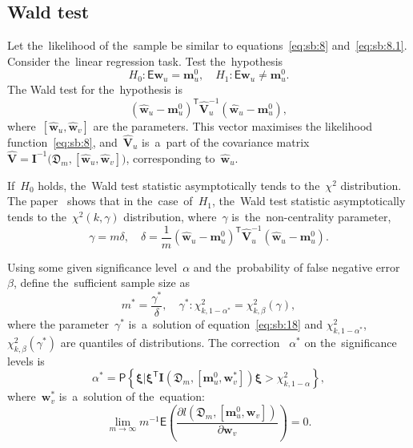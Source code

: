 \documentclass[
11pt,%
tightenlines,%
twoside,%
onecolumn,%
nofloats,%
nobibnotes,%
nofootinbib,%
superscriptaddress,%
noshowpacs,%
centertags]%
{revtex4}
\begin{document}
\subsection{Wald test}
Let the~likelihood of the~sample be similar to equations~\eqref{eq:sb:8} and~\eqref{eq:sb:8.1}. Consider the~linear regression task. Test the~hypothesis
\[
\label{eq:sb:15}
	H_0: \mathsf{E}\mathbf{w}_{u} = \mathbf{m}_{u}^{0}, \quad H_1: \mathsf{E}\mathbf{w}_{u} \not=\mathbf{m}_{u}^{0}.
\]
The Wald test for the~hypothesis is
\[
\label{eq:sb:16}
	\left(\hat{\mathbf{w}}_{u} - \mathbf{m}_{u}^{0}\right)^{\mathsf{T}}\hat{\mathbf{V}}_{u}^{-1}\left(\hat{\mathbf{w}}_{u} - \mathbf{m}_{u}^{0}\right),
\]
where~$[\hat{\mathbf{w}}_{u},\hat{\mathbf{w}}_{v}]$ are the parameters. This vector maximises the likelihood function~\eqref{eq:sb:8}, and~$\hat{\mathbf{V}}_u$ is~a~part of the covariance matrix~$\hat{\mathbf{V}}=\mathbf{I}^{-1}\bigr(\mathfrak{D}_m, [\hat{\mathbf{w}}_{u},\hat{\mathbf{w}}_{v}]\bigr)$, corresponding to~$\hat{\mathbf{w}}_{u}$.

If~$H_0$ holds, the~Wald test statistic asymptotically tends to the~$\chi^2$ distribution. The paper~\cite{shieh2005} shows that in the~case~of~$H_1$, the~Wald test statistic asymptotically tends to the~$\chi^2(k,\gamma)$ distribution, where~$\gamma$ is~the~non-centrality parameter,
\[
\label{eq:sb:17}
	\gamma = m\delta, \quad \delta = \frac{1}{m}\left(\hat{\mathbf{w}}_{u} - \mathbf{m}_{u}^{0}\right)^{\mathsf{T}}\hat{\mathbf{V}}_u^{-1}\left(\hat{\mathbf{w}}_{u} - \mathbf{m}_{u}^{0}\right).
\]

Using some given significance level~$\alpha$ and the~probability of false negative error~$\beta$, define the~sufficient sample size as
\[
\label{eq:sb:18}
	m^* = \frac{\gamma^*}{\delta}, \quad \gamma^*:\chi^2_{k, 1-\alpha^{*}} = \chi^2_{k, \beta}\left(\gamma\right),
\]
where the parameter~$\gamma^*$ is~a~solution of equation~\eqref{eq:sb:18} and $\chi^2_{k, 1-\alpha^*}$,~$\chi^2_{k, \beta}\left(\gamma^*\right)$ are quantiles of distributions. The correction ~$\alpha^*$ on the~significance levels is
\[
\label{eq:sb:19}
	\alpha^* = \mathsf{P}\left\{\bm{\xi} | \bm{\xi}^{\mathsf{T}}\mathbf{I}\left(\mathfrak{D}_m, \left[\mathbf{m}_{u}^{0}, \mathbf{w}^{*}_v\right]\right)\bm{\xi} > \chi^2_{k,1 - \alpha}\right\},
\]
where~$\mathbf{w}^{*}_v$ is~a~solution of the~equation:
\[
\label{eq:sb:20}
	\lim_{m\to\infty}m^{-1}\mathsf{E}\left(\frac{\partial l\left(\mathfrak{D}_m, \left[ \mathbf{m}_{u}^{0}, \mathbf{w}_{v}\right]\right)}{\partial \mathbf{w}_{v}}\right) = 0.
\]
\end{document}
